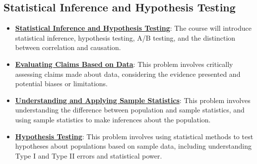 \documentclass{article}%
\begin{document}
%
\subsection{Statistical Inference and Hypothesis Testing}%
\label{subsec:StatisticalInferenceandHypothesisTesting}%
\begin{itemize}[leftmargin=*]%
\item \href{https://purdue.brightspace.com/d2l/common/assets/pdfjs-d2l-dist/1.0.14-legacy/web/viewer.html?file=\%2Fcontent\%2Fenforced\%2F1095465-WL.202510.CS24200.LE1\%2F01L1-introduction.pdf\%3Fou\%3D1095465\&lang=en-us\&container=d2l-fileviewer-rendered-pdf\&fullscreen=d2l-fileviewer-rendered-pdf-dialog\&height=667#page=4}{\textbf{Statistical Inference and Hypothesis Testing}}: The course will introduce statistical inference, hypothesis testing, A/B testing, and the distinction between correlation and causation.%
\item \href{https://purdue.brightspace.com/d2l/common/assets/pdfjs-d2l-dist/1.0.14-legacy/web/viewer.html?file=\%2Fcontent\%2Fenforced\%2F1095465-WL.202510.CS24200.LE1\%2F13L2-hypothesis.pdf\%3Fou\%3D1095465\&lang=en-us\&container=d2l-fileviewer-rendered-pdf\&fullscreen=d2l-fileviewer-rendered-pdf-dialog\&height=667#page=4}{\textbf{Evaluating Claims Based on Data}}: This problem involves critically assessing claims made about data, considering the evidence presented and potential biases or limitations.%
\item \href{https://purdue.brightspace.com/d2l/common/assets/pdfjs-d2l-dist/1.0.14-legacy/web/viewer.html?file=\%2Fcontent\%2Fenforced\%2F1095465-WL.202510.CS24200.LE1\%2F13L2-hypothesis.pdf\%3Fou\%3D1095465\&lang=en-us\&container=d2l-fileviewer-rendered-pdf\&fullscreen=d2l-fileviewer-rendered-pdf-dialog\&height=667#page=11}{\textbf{Understanding and Applying Sample Statistics}}: This problem involves understanding the difference between population and sample statistics, and using sample statistics to make inferences about the population.%
\item \href{https://purdue.brightspace.com/d2l/common/assets/pdfjs-d2l-dist/1.0.14-legacy/web/viewer.html?file=\%2Fcontent\%2Fenforced\%2F1095465-WL.202510.CS24200.LE1\%2F13L2-hypothesis.pdf\%3Fou\%3D1095465\&lang=en-us\&container=d2l-fileviewer-rendered-pdf\&fullscreen=d2l-fileviewer-rendered-pdf-dialog\&height=667#page=12}{\textbf{Hypothesis Testing}}: This problem involves using statistical methods to test hypotheses about populations based on sample data, including understanding Type I and Type II errors and statistical power.%

\end{itemize}
\end{document}
